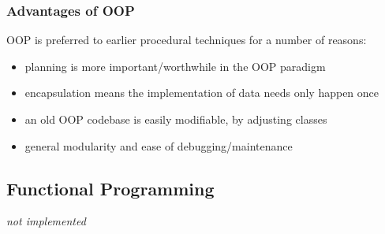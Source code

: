 \documentclass[9pt]{article}
\begin{document}
\subsubsection{Advantages of OOP}
\label{sec:org2a50206}

OOP is preferred to earlier procedural techniques for a number of reasons:

\begin{itemize}
\item planning is more important/worthwhile in the OOP paradigm
\item encapsulation means the implementation of data needs only happen once
\item an old OOP codebase is easily modifiable, by adjusting classes
\item general modularity and ease of debugging/maintenance
\end{itemize}

\subsection{Functional Programming}
\label{sec:org2466312}

\emph{not implemented}
\end{document}
